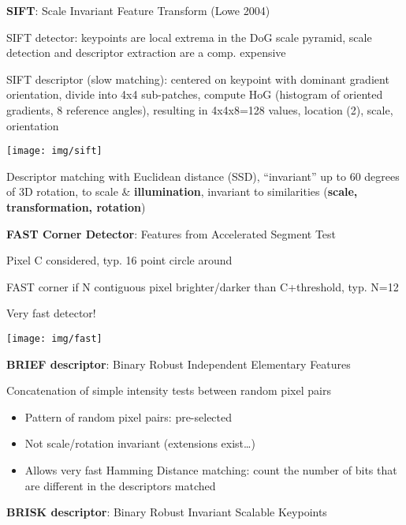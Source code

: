 \documentclass[fontsize=6pt]{scrartcl}
\begin{document}
\begin{multicols*}{4}
\textbf{SIFT}: Scale Invariant Feature Transform (Lowe 2004)

SIFT detector: keypoints are local extrema in the DoG scale pyramid, scale detection and descriptor extraction are a comp. expensive

\begin{minipage}{0.6\linewidth}
	SIFT descriptor  (slow matching): centered on keypoint with	dominant gradient orientation, divide into 4x4 sub-patches, compute HoG (histogram of oriented gradients, 8 reference angles), resulting in 4x4x8=128 values, location (2), scale, orientation
\end{minipage}
\begin{minipage}{0.40\linewidth}
	\texttt{[image: img/sift]}
\end{minipage}
Descriptor matching with Euclidean distance (SSD), \enquote{invariant} up to 60 degrees of 3D rotation, to scale \& \textbf{illumination}, invariant to similarities (\textbf{scale, transformation, rotation})

\begin{minipage}{0.77\linewidth}
	\textbf{FAST Corner Detector}: Features from Accelerated Segment Test
	
	Pixel C considered, typ. 16 point circle around
	
	FAST corner if N contiguous pixel brighter/darker than C+threshold, typ. N=12
	
	Very fast detector!
\end{minipage}
\begin{minipage}{0.22\linewidth}
	\texttt{[image: img/fast]}
\end{minipage}

\textbf{BRIEF descriptor}: Binary Robust Independent Elementary Features

Concatenation of simple intensity tests between random pixel pairs

\begin{itemize}
	\item Pattern of random pixel pairs: pre-selected
	\item Not scale/rotation invariant (extensions exist…)
	\item Allows very fast Hamming Distance matching:
	count the number of bits that are different in the descriptors matched
\end{itemize}

\textbf{BRISK descriptor}: Binary Robust Invariant Scalable Keypoints	


\end{multicols*}
\end{document}
